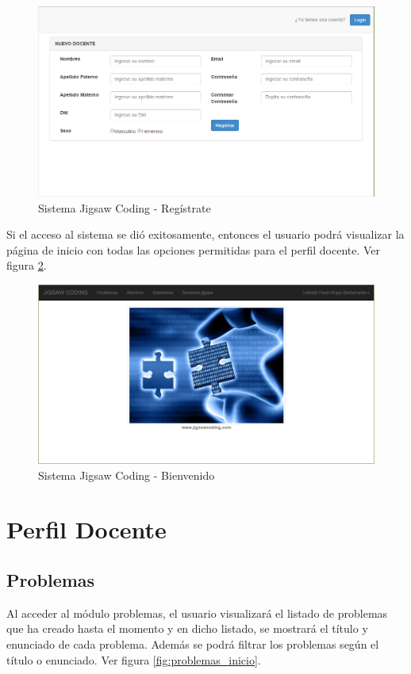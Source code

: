 \begin{figure}[h!]
	\centering
	\caption[SJC Registrate]{Sistema Jigsaw Coding - Regístrate}
	\label{fig:login_registrate}
	\includegraphics[scale=0.5]{figuras/usodelsistema/login_registrate}	
\end{figure}

Si el acceso al sistema se dió exitosamente, entonces el usuario podrá visualizar la página de inicio con todas las opciones permitidas para el perfil docente. Ver figura \ref{fig:inicio}.

\begin{figure}[h!]
\centering
\caption[SJC Inicio]{Sistema Jigsaw Coding - Bienvenido}
\label{fig:inicio}
\includegraphics[scale=0.5]{figuras/usodelsistema/docente/inicio}
\end{figure}
\clearpage
\section*{Perfil Docente}

\subsection{Problemas}
Al acceder al módulo problemas, el usuario visualizará el listado de problemas que ha creado hasta el momento y en dicho listado, se mostrará el título y enunciado de cada problema. Además se podrá filtrar los problemas según el título o enunciado. Ver figura \ref{fig:problemas_inicio}.

